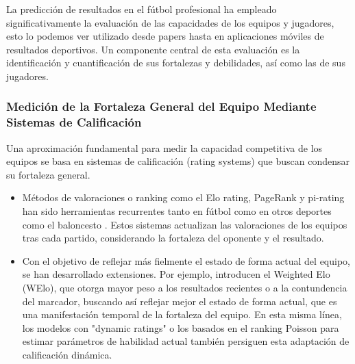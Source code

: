 La predicción de resultados en el fútbol profesional ha empleado significativamente la evaluación de las capacidades de los equipos y jugadores, esto lo podemos ver utilizado desde papers hasta en aplicaciones móviles de resultados deportivos. Un componente central de esta evaluación es la identificación y cuantificación de sus fortalezas y debilidades, así como las de sus jugadores.

\subsubsection{Medición de la Fortaleza General del Equipo Mediante Sistemas de Calificación}

Una aproximación fundamental para medir la capacidad competitiva de los equipos se basa en sistemas de calificación (rating systems) que buscan condensar su fortaleza general.

\begin{itemize}
    \item Métodos de valoraciones o ranking como el Elo rating, PageRank y pi-rating han sido herramientas recurrentes tanto en fútbol \cite{macleanReviewNFL20192022, owenDynamicBayesianForecasting2011} como en otros deportes como el baloncesto \cite{lampisPredictionsEuropeanBasketball2023}. Estos sistemas actualizan las valoraciones de los equipos tras cada partido, considerando la fortaleza del oponente y el resultado.
    \item Con el objetivo de reflejar más fielmente el estado de forma actual del equipo, se han desarrollado extensiones. Por ejemplo, \cite{angeliniWeightedEloRating2022} introducen el Weighted Elo (WElo), que otorga mayor peso a los resultados recientes o a la contundencia del marcador, buscando así reflejar mejor el estado de forma actual, que es una manifestación temporal de la fortaleza del equipo. En esta misma línea, los modelos con "dynamic ratings" \cite{holmesForecastingFootballMatch2024} o los basados en el ranking Poisson para estimar parámetros de habilidad actual \cite{leyRankingSoccerTeams2019} también persiguen esta adaptación de calificación dinámica.
\end{itemize}
